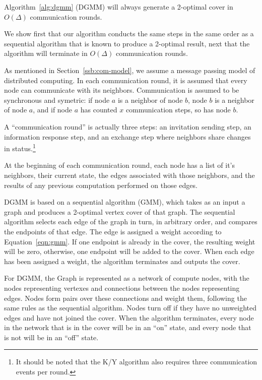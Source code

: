 \begin{thm}
  Algorithm~\ref{alg:dgmm} (DGMM) will always generate a 2-optimal cover in $O(\Delta)$ communication rounds.
\label{thm:dgmm-term}
\end{thm}
\begin{smy}
We show first that our algorithm conducts the same steps in the same order as a sequential algorithm that is known to produce a 2-optimal result, next that the algorithm will terminate in $O(\Delta)$ communication rounds.
\end{smy} 

\begin{note}
\label{not:com-model}
As mentioned in Section~\ref{ssb:com-model}, we assume a message passing model of distributed computing. In each communication round, it is assumed that every node can communicate with its neighbors. Communication is assumed to be synchronous and symetric: if node $a$ is a neighbor of node $b$, node $b$ is a neighbor of node $a$, and if node $a$ has counted $x$ communication steps, so has node $b$.

A ``communication round'' is actually three steps: an invitation sending step, an information response step, and an exchange step where neighbors share changes in status.\footnote{It should be noted that the K/Y algorithm also requires three communication events per round.} 
\end{note}
\begin{note}
\label{not:dgmm-local-info}
At the beginning of each communication round, each node has a list of it's neighbors, their current state, the edges associated with those neighbors, and the results of any previous computation performed on those edges.
\end{note}
\begin{note}
\label{not:gmm-dgmm}
DGMM is based on a sequential algorithm (GMM), which takes as an input a graph and produces a 2-optimal vertex cover of that graph. The sequential algorithm selects each edge of the graph in turn, in arbitrary order, and compares the endpoints of that edge. The edge is assigned a weight according to Equation~\ref{eqn:gmm}. If one endpoint is already in the cover, the resulting weight will be zero, otherwise, one endpoint will be added to the cover. When each edge has been assigned a weight, the algorithm terminates and outputs the cover.

For DGMM, the Graph is represented as a network of compute nodes, with the nodes representing vertexes and connections between the nodes representing edges. Nodes form pairs over these connections and weight them, following the same rules as the sequential algorithm. Nodes turn off if they have no unweighted edges and have not joined the cover. When the algorithm terminates, every node in the network that is in the cover will be in an ``on'' state, and every node that is not will be in an ``off'' state.
\end{note}
